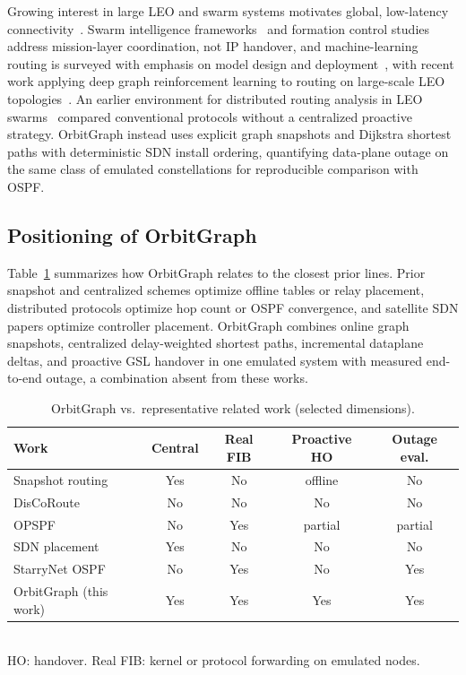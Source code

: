 Growing interest in large LEO and swarm systems motivates global, low-latency
connectivity~\cite{smallsats2020,asri2024swarm,farrag:swarm-survey:2021}.
Swarm intelligence frameworks~\cite{chen2022swarm} and formation control
studies~\cite{fangchen2022pdg} address mission-layer coordination, not IP
handover, and machine-learning routing is surveyed with emphasis on model design
and deployment~\cite{zhu:ml-routing-survey:2025}, with recent work applying deep
graph reinforcement learning to routing on large-scale LEO
topologies~\cite{huang:graph-rl-leo-routing:2026}.
An earlier environment for distributed routing analysis in LEO
swarms~\cite{online:silleo-routing:2025} compared conventional protocols without
a centralized proactive strategy.
OrbitGraph instead uses explicit graph snapshots and Dijkstra shortest paths
with deterministic SDN install ordering, quantifying data-plane outage on the
same class of emulated constellations for reproducible comparison with OSPF.

\subsection{Positioning of OrbitGraph}

Table~\ref{tab:related-positioning} summarizes how OrbitGraph relates to the
closest prior lines.
Prior snapshot and centralized schemes optimize offline tables or relay
placement, distributed protocols optimize hop count or OSPF convergence, and
satellite SDN papers optimize controller placement.
OrbitGraph combines online graph snapshots, centralized delay-weighted shortest
paths, incremental dataplane deltas, and proactive GSL handover in one emulated
system with measured end-to-end outage, a combination absent from these works.

\begin{table}[!h]
  \centering
  \caption{OrbitGraph vs.\ representative related work (selected dimensions).}
  \label{tab:related-positioning}
  \renewcommand{\arraystretch}{1.1}
  \footnotesize
  \begin{tabular}{@{}lcccc@{}}
    \hline
    Work & Central & Real FIB & Proactive HO & Outage eval. \\
    \hline
    Snapshot routing~\cite{seong:topological-design:1995} & Yes & No  & offline & No \\
    DisCoRoute~\cite{gregory:satellite-routing:2022} & No  & No  & No      & No \\
    OPSPF~\cite{pam:opspf:2019} & No  & Yes & partial & partial \\
    SDN placement~\cite{papa:sdn-cpp:2018,guo:spda:2022} & Yes & No  & No      & No \\
    StarryNet OSPF~\cite{lai2023starrynet} & No  & Yes & No      & Yes \\
    OrbitGraph (this work) & Yes & Yes & Yes     & Yes \\
    \hline
  \end{tabular}
  \\[0.4em]
  \footnotesize
  HO: handover. Real FIB: kernel or protocol forwarding on emulated nodes.
\end{table}
